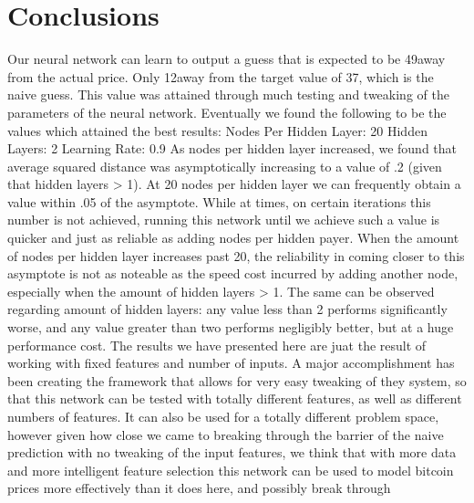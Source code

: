\documentclass[a4paper,11pt]{article}
\begin{document}
\section{Conclusions}
Our neural network can learn to output a guess that is expected to be 49\cent away from the actual price.  Only 12\cent away from
the target value of 37\cent, which is the naive guess.  This value was attained through much testing and tweaking of the parameters
of the neural network.  Eventually we found the following to be the values which attained the best results:
\newline \newline Nodes Per Hidden Layer: 20
\newline \newline Hidden Layers: 2
\newline \newline Learning Rate: 0.9
\newline \newline
As nodes per hidden layer increased, we found that average squared distance was asymptotically increasing to a value of .2 (given
that hidden layers > 1).  At 20 nodes per hidden layer we can frequently obtain a value within .05 of the asymptote.  While at
times, on certain iterations this number is not achieved, running this network until we achieve such a value is quicker
and just as reliable as adding nodes per hidden payer.  When the amount of nodes per hidden layer increases past 20, the reliability
in coming closer to this asymptote is not as noteable as the speed cost incurred by adding another node, especially when the 
amount of hidden layers > 1.  
\newline \newline
The same can be observed regarding amount of hidden layers: any value less than 2 performs significantly worse, and any value greater
than two performs negligibly better, but at a huge performance cost.  The results we have presented here are juat the result of
working with fixed features and number of inputs.  A major accomplishment has been creating the framework that allows for very easy
tweaking of they system, so that this network can be tested with totally different features, as well as different numbers of 
features.  It can also be used for a totally different problem space, however given how close we came to breaking through the
barrier of the naive prediction with no tweaking of the input features, we think that with more data and more intelligent feature
selection this network can be used to model bitcoin prices more effectively than it does here, and possibly break through
\end{document}
